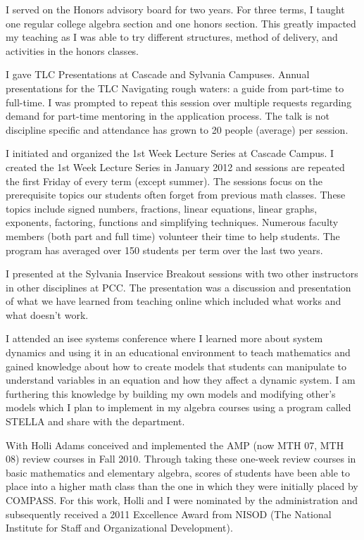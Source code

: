 \begin{description}[style=nextline]
	I served on the Honors advisory board for two years.  For three terms, I taught
	one regular college algebra section and one honors section. This greatly
	impacted my teaching as I was able to try different structures, method of
	delivery, and activities in the honors classes.

	\item[Tammy Louie (Full-time Instructor, Cascade Campus)]
	I gave TLC Presentations at Cascade and Sylvania Campuses.  Annual
	presentations for the TLC Navigating rough waters: a guide from part-time
	to full-time. I was prompted to repeat this session over multiple requests
	regarding demand for part-time mentoring in the application process. The talk
	is not discipline specific and attendance has grown to 20 people (average) per
	session.

	I initiated and organized the 1st Week Lecture Series at Cascade
	Campus.  I created the 1st Week Lecture Series in January 2012 and sessions are
	repeated the first Friday of every term (except summer). The sessions focus on
	the prerequisite topics our students often forget from previous math classes.
	These topics include signed numbers, fractions, linear equations, linear
	graphs, exponents, factoring, functions and simplifying techniques. Numerous
	faculty members (both part and full time) volunteer their time to help
	students. The program has averaged over 150 students per term over the last two
	years.

	\item[Rita Luetkenhaus (Full-time Instructor, Sylvania Campus)]
	I presented at the Sylvania Inservice Breakout sessions with two other
	instructors in other disciplines at PCC.  The presentation was a discussion and
	presentation of what we have learned from teaching online which included what
	works and what doesn't work.

	I attended an isee systems conference where I learned more about system
	dynamics and using it in an educational environment to teach mathematics and
	gained knowledge about how to create models that students can manipulate to
	understand variables in an equation and how they affect a dynamic system.  I am
	furthering this knowledge by building my own models and modifying other's
	models which I plan to implement in my algebra courses using a program called
	STELLA and share with the department.

	\item[Michael Marciniak, (Faculty Chair, Cascade Campus)]
	With Holli Adams conceived and implemented the AMP (now MTH 07, MTH 08) review
	courses in Fall 2010.  Through taking these one-week review courses in basic
	mathematics and elementary algebra, scores of students have been able to place
	into a higher math class than the one in which they were initially placed by
	COMPASS.   For this work, Holli and I were nominated by the administration and
	subsequently received a 2011 Excellence Award from NISOD (The National
	Institute for Staff and Organizational Development).


\end{description}
